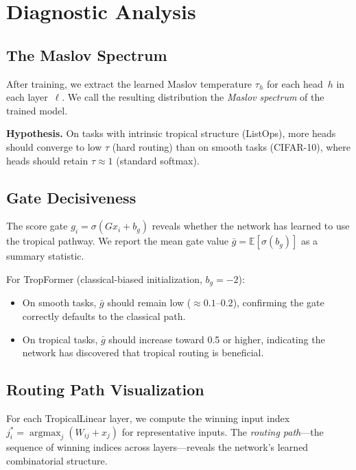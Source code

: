 \documentclass[11pt,twocolumn]{article}
\newcommand{\argmax}{\operatorname{argmax}}
\begin{document}
\section{Diagnostic Analysis}\label{sec:diagnostics}

\subsection{The Maslov Spectrum}

After training, we extract the learned Maslov temperature $\tau_h$ for each
head~$h$ in each layer~$\ell$. We call the resulting distribution the
\emph{Maslov spectrum} of the trained model.

\textbf{Hypothesis.} On tasks with intrinsic tropical structure (ListOps),
more heads should converge to low $\tau$ (hard routing) than on smooth tasks
(CIFAR-10), where heads should retain $\tau \approx 1$ (standard softmax).


\subsection{Gate Decisiveness}

The score gate $g_i = \sigma(G x_i + b_g)$ reveals whether the network has
learned to use the tropical pathway. We report the mean gate value
$\bar{g} = \mathbb{E}[\sigma(b_g)]$ as a summary statistic.

For TropFormer (classical-biased initialization, $b_g = -2$):
\begin{itemize}[nosep]
  \item On smooth tasks, $\bar{g}$ should remain low ($\approx 0.1$--$0.2$),
    confirming the gate correctly defaults to the classical path.
  \item On tropical tasks, $\bar{g}$ should increase toward 0.5 or higher,
    indicating the network has discovered that tropical routing is beneficial.
\end{itemize}

\subsection{Routing Path Visualization}

For each TropicalLinear layer, we compute the winning input index
$j^*_i = \argmax_j(W_{ij} + x_j)$ for representative inputs. The
\emph{routing path}---the sequence of winning indices across layers---reveals
the network's learned combinatorial structure.
\end{document}
